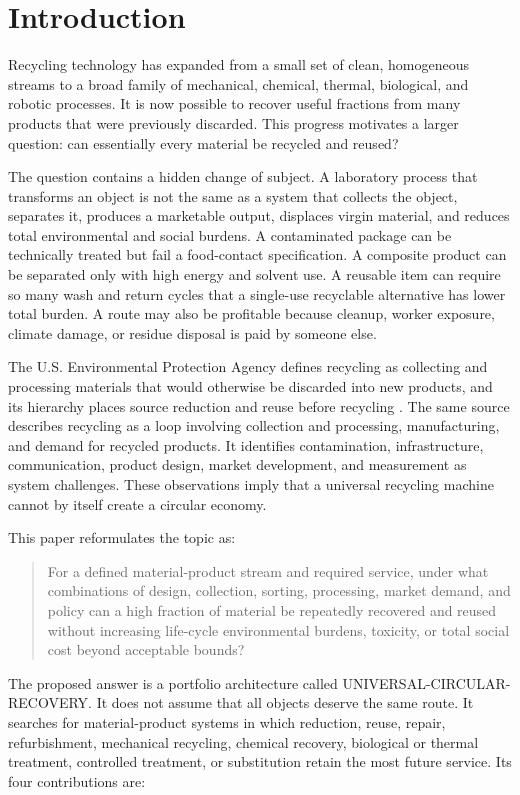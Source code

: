\documentclass[conference]{IEEEtran}
\begin{document}
\section{Introduction}

Recycling technology has expanded from a small set of clean, homogeneous streams to a broad family of mechanical, chemical, thermal, biological, and robotic processes. It is now possible to recover useful fractions from many products that were previously discarded. This progress motivates a larger question: can essentially every material be recycled and reused?

The question contains a hidden change of subject. A laboratory process that transforms an object is not the same as a system that collects the object, separates it, produces a marketable output, displaces virgin material, and reduces total environmental and social burdens. A contaminated package can be technically treated but fail a food-contact specification. A composite product can be separated only with high energy and solvent use. A reusable item can require so many wash and return cycles that a single-use recyclable alternative has lower total burden. A route may also be profitable because cleanup, worker exposure, climate damage, or residue disposal is paid by someone else.

The U.S. Environmental Protection Agency defines recycling as collecting and processing materials that would otherwise be discarded into new products, and its hierarchy places source reduction and reuse before recycling \cite{epa}. The same source describes recycling as a loop involving collection and processing, manufacturing, and demand for recycled products. It identifies contamination, infrastructure, communication, product design, market development, and measurement as system challenges. These observations imply that a universal recycling machine cannot by itself create a circular economy.

This paper reformulates the topic as:

\begin{quote}
For a defined material-product stream and required service, under what combinations of design, collection, sorting, processing, market demand, and policy can a high fraction of material be repeatedly recovered and reused without increasing life-cycle environmental burdens, toxicity, or total social cost beyond acceptable bounds?
\end{quote}

The proposed answer is a portfolio architecture called UNIVERSAL-CIRCULAR-RECOVERY. It does not assume that all objects deserve the same route. It searches for material-product systems in which reduction, reuse, repair, refurbishment, mechanical recycling, chemical recovery, biological or thermal treatment, controlled treatment, or substitution retain the most future service. Its four contributions are:
\end{document}
